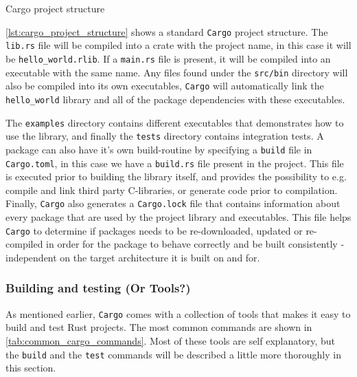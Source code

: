 \begin{listing}
\caption{Cargo project structure}
\label{lst:cargo_project_structure}
\end{listing}

\autoref{lst:cargo_project_structure} shows a standard \texttt{Cargo} project structure.
The \texttt{lib.rs} file will be compiled into a crate with the project name, in this case it will be \texttt{hello\_world.rlib}.
If a \texttt{main.rs} file is present, it will be compiled into an executable with the same name.
Any files found under the \texttt{src/bin} directory will also be compiled into its own executables, \texttt{Cargo} will automatically link the \texttt{hello\_world} library and all of the package dependencies with these executables.

The \texttt{examples} directory contains different executables that demonstrates how to use the library, and finally the \texttt{tests} directory contains integration tests.
A package can also have it's own build-routine by specifying a \texttt{build} file in \texttt{Cargo.toml}, in this case we have a \texttt{build.rs} file present in the project.
This file is executed prior to building the library itself, and provides the possibility to e.g. compile and link third party C-libraries, or generate code prior to compilation.
Finally, \texttt{Cargo} also generates a \texttt{Cargo.lock} file that contains information about every package that are used by the project library and executables.
This file helps \texttt{Cargo} to determine if packages needs to be re-downloaded, updated or re-compiled in order for the package to behave correctly and be built consistently - independent on the target architecture it is built on and for.

\subsubsection{Building and testing (Or Tools?)}

As mentioned earlier, \texttt{Cargo} comes with a collection of tools that makes it easy to build and test Rust projects.
The most common commands are shown in \autoref{tab:common_cargo_commands}.
Most of these tools are self explanatory, but the \texttt{build} and the \texttt{test} commands will be described a little more thoroughly in this section.

